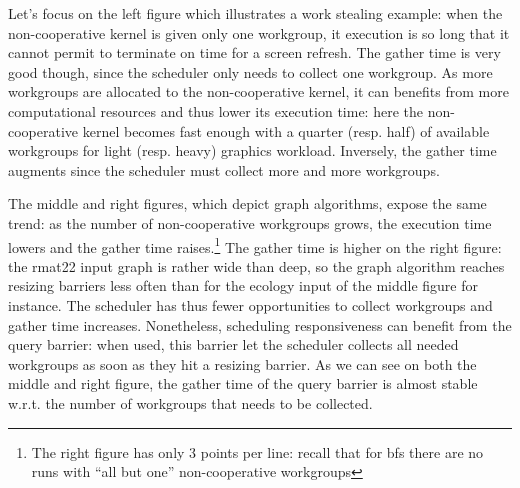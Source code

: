 \documentclass[numbers,nocopyrightspace,10pt]{sigplanconf}
\begin{document}
Let's focus on the left figure which illustrates a work stealing
example: when the non-cooperative kernel is given only one workgroup, it
execution is so long that it cannot permit to terminate on time for a
screen refresh. The gather time is very good though, since the scheduler
only needs to collect one workgroup. As more workgroups are allocated to
the non-cooperative kernel, it can benefits from more computational
resources and thus lower its execution time: here the non-cooperative
kernel becomes fast enough with a quarter (resp. half) of available
workgroups for light (resp. heavy) graphics workload. Inversely, the
gather time augments since the scheduler must collect more and more
workgroups.

The middle and right figures, which depict graph algorithms, expose the
same trend: as the number of non-cooperative workgroups grows, the
execution time lowers and the gather time raises.\footnote{The right
figure has only 3 points per line: recall that for bfs there are no runs
with ``all but one'' non-cooperative workgroups}
%
The gather time is higher on the right figure: the rmat22 input graph is
rather wide than deep, so the graph algorithm reaches resizing barriers
less often than for the ecology input of the middle figure for
instance. The scheduler has thus fewer opportunities to collect
workgroups and gather time increases. Nonetheless, scheduling
responsiveness can benefit from the query barrier: when used, this
barrier let the scheduler collects all needed workgroups as soon as they
hit a resizing barrier. As we can see on both the middle and right
figure, the gather time of the query barrier is almost stable w.r.t. the
number of workgroups that needs to be collected.
\end{document}

